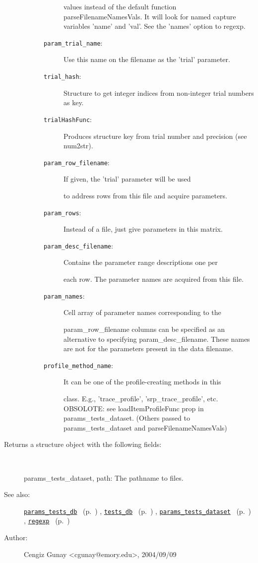 \begin{description}
\begin{description}
\begin{description}
values instead of the default function
parseFilenameNamesVals. It will look for named capture
variables 'name' and 'val'. See the 'names' option to regexp.
\item[\texttt{param\_trial\_name}:]
 Use this name on the filename as the 'trial' parameter.
\item[\texttt{trial\_hash}:]
 Structure to get integer indices from non-integer trial numbers as key.
\item[\texttt{trialHashFunc}:]
 Produces structure key from trial number and precision (see num2str).
\item[\texttt{param\_row\_filename}:]
 If given, the 'trial' parameter will be used

to address rows from this file and acquire parameters.
\item[\texttt{param\_rows}:]
 Instead of a file, just give parameters in this matrix.
\item[\texttt{param\_desc\_filename}:]
 Contains the parameter range descriptions one per 

each row. The parameter names are acquired from this file.
\item[\texttt{param\_names}:]
 Cell array of parameter names corresponding to the 

param\_row\_filename columns can be specified as an alternative to
specifying param\_desc\_filename. These names are not for the 
parameters present in the data filename.
\item[\texttt{profile\_method\_name}:]
 It can be one of the profile-creating methods in this

class. E.g., 'trace\_profile', 'srp\_trace\_profile',
etc. OBSOLOTE: see loadItemProfileFunc prop in
params\_tests\_dataset.
(Others passed to params\_tests\_dataset and parseFilenameNamesVals)
\end{description}%
\end{description}%
%
\item[Returns a structure object with the following fields:
]~

   params\_tests\_dataset,
   path: The pathname to files.
%
%
\item[See also:]%
\hyperlink{ref_params_tests_db}{\texttt{params\_tests\_db}}%
\ (p.~\pageref{ref_params_tests_db})%
%
, \hyperlink{ref_tests_db}{\texttt{tests\_db}}%
\ (p.~\pageref{ref_tests_db})%
%
, \hyperlink{ref_params_tests_dataset}{\texttt{params\_tests\_dataset}}%
\ (p.~\pageref{ref_params_tests_dataset})%
%
, \hyperlink{ref_regexp}{\texttt{regexp}}%
\ (p.~\pageref{ref_regexp})%
%
%
\item[Author:]%
Cengiz Gunay <cgunay@emory.edu>, 2004/09/09
%
\end{description}
\methodline%
